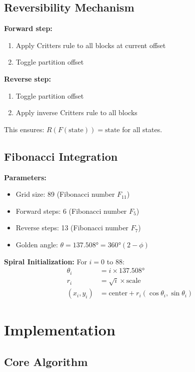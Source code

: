 \documentclass[11pt]{article}
\begin{document}
\subsection{Reversibility Mechanism}

\textbf{Forward step:}
\begin{enumerate}
\item Apply Critters rule to all blocks at current offset
\item Toggle partition offset
\end{enumerate}

\textbf{Reverse step:}
\begin{enumerate}
\item Toggle partition offset
\item Apply inverse Critters rule to all blocks
\end{enumerate}

This ensures: $R(F(\text{state})) = \text{state}$ for all states.

\subsection{Fibonacci Integration}

\textbf{Parameters:}
\begin{itemize}
\item Grid size: 89 (Fibonacci number $F_{11}$)
\item Forward steps: 6 (Fibonacci number $F_5$)
\item Reverse steps: 13 (Fibonacci number $F_7$)
\item Golden angle: $\theta = 137.508° = 360°(2 - \phi)$
\end{itemize}

\textbf{Spiral Initialization:}
For $i = 0$ to $88$:
\begin{align*}
\theta_i &= i \times 137.508° \\
r_i &= \sqrt{i} \times \text{scale} \\
(x_i, y_i) &= \text{center} + r_i(\cos \theta_i, \sin \theta_i)
\end{align*}

\section{Implementation}

\subsection{Core Algorithm}
\end{document}
